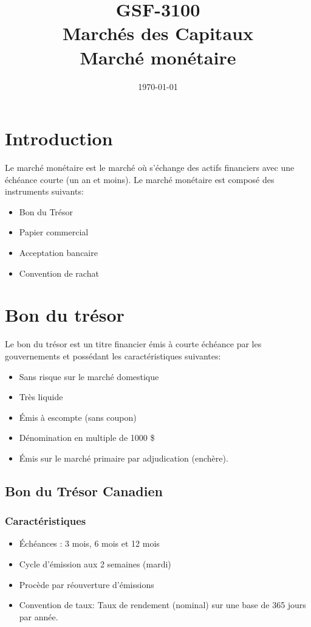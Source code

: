 \documentclass[12pt]{article}
\begin{document}
\begin{titlepage}
\title{GSF-3100 \\ Marchés des Capitaux \\ Marché monétaire}
\date{\today}
\maketitle

\setcounter{page}{0}
\thispagestyle{empty}
\end{titlepage}
\pagebreak \newpage

\tableofcontents
\pagebreak \newpage
\section{Introduction}
Le marché monétaire est le marché où s’échange des actifs financiers avec une échéance courte (un an et moins).  Le marché monétaire est composé des instruments suivants:
\begin{itemize}
\item Bon du Trésor
\item Papier commercial
\item Acceptation bancaire
\item Convention de rachat
\end{itemize}
\section{Bon du trésor}
Le bon du trésor est un titre financier émis à courte échéance par les gouvernements et possédant les caractéristiques suivantes:
\begin{itemize}
\item Sans risque sur le marché domestique
\item Très liquide
\item Émis à escompte (sans coupon)
\item Dénomination en multiple de 1000 \$
\item Émis sur le marché primaire par adjudication (enchère).
\end{itemize}
\newpage
\subsection{Bon du Trésor Canadien}
\subsubsection{Caractéristiques}
\begin{itemize}
\item Échéances : 3 mois,  6 mois et 12 mois
\item Cycle d’émission aux 2 semaines (mardi)
\item Procède par réouverture d’émissions
\item Convention de taux: Taux de rendement (nominal) sur une base de 365 jours par année.
\end{itemize}
\end{document}
